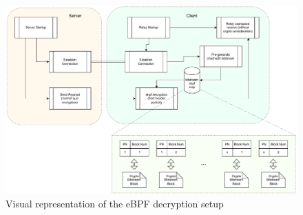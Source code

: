 \documentclass[a4paper,12pt]{article}
\begin{document}
\begin{figure}
    \centering
    \includegraphics[width=\textwidth]{crypto_poc_interaction.pdf}
    \caption{Visual representation of the eBPF decryption setup}
    \label{fig:ebpf-crypto-setup}
\end{figure}

\vspace{2cm}

\end{document}
